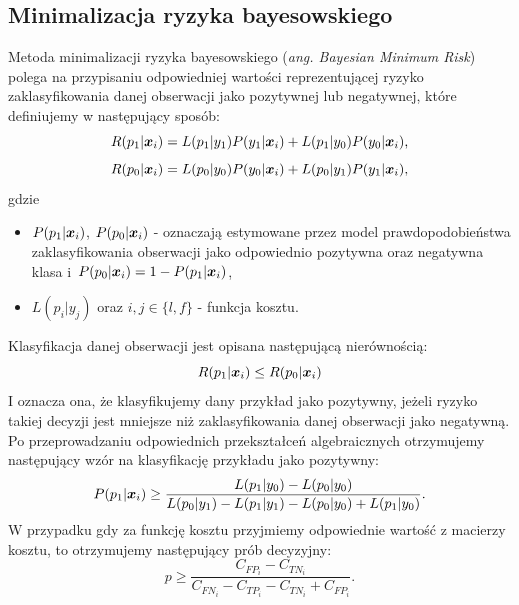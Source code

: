 \documentclass[inzynierska]{pwr_wmat_praca_dyplomowa}
\theoremstyle{plain}
\numberwithin{theorem}{chapter}
\theoremstyle{definition}
\numberwithin{theorem}{chapter}
\begin{document}
\subsection{Minimalizacja ryzyka bayesowskiego}
Metoda minimalizacji ryzyka bayesowskiego (\textit{ang. Bayesian Minimum Risk}) polega na przypisaniu odpowiedniej wartości reprezentującej ryzyko zaklasyfikowania danej obserwacji jako pozytywnej lub negatywnej, które definiujemy w następujący sposób:
$$ R(p_1|\boldsymbol{x}_{i}) = L(p_1|y_1)P(y_1|\boldsymbol{x}_{i}) + L(p_1|y_0)P(y_0|\boldsymbol{x}_{i}) \text{,}$$
$$ R(p_0|\boldsymbol{x}_{i}) = L(p_0|y_0)P(y_0|\boldsymbol{x}_{i}) + L(p_0|y_1)P(y_1|\boldsymbol{x}_{i}) \text{,}$$
gdzie
\begin{itemize}
	\item $P(p_1|\boldsymbol{x}_{i})$, $P(p_0|\boldsymbol{x}_{i})$ - oznaczają estymowane przez model prawdopodobieństwa zaklasyfikowania obserwacji jako odpowiednio pozytywna oraz negatywna klasa i~$P(p_0|\boldsymbol{x}_{i}) = 1 - P(p_1|\boldsymbol{x}_{i})$,
	\item $L(p_{i}|y_{j})$ oraz $i,j \in \{l,f\}$ - funkcja kosztu.
\end{itemize}{}
Klasyfikacja danej obserwacji jest opisana następującą nierównością:
$$ R(p_1|\boldsymbol{x}_{i}) \leq R(p_0|\boldsymbol{x}_{i})$$
I oznacza ona, że klasyfikujemy dany przykład jako pozytywny, jeżeli ryzyko takiej decyzji jest mniejsze niż zaklasyfikowania danej obserwacji jako negatywną. 
Po przeprowadzaniu odpowiednich przekształceń algebraicznych otrzymujemy następujący wzór na klasyfikację przykładu jako pozytywny:
$$ P(p_1|\boldsymbol{x}_{i}) \ge \frac{L(p_1|y_0) - L(p_0|y_0)}{L(p_0|y_1) - L(p_1|y_1) - L(p_0|y_0) + L(p_1|y_0)} \text{.}$$
W przypadku gdy za funkcję kosztu przyjmiemy odpowiednie wartość z macierzy kosztu, to otrzymujemy następujący prób decyzyjny:
$$ p \ge \frac{C_{FP_i} - C_{TN_i}}{C_{FN_i} - C_{TP_i} - C_{TN_i} + C_{FP_i}} \text{.}$$
\end{document}
